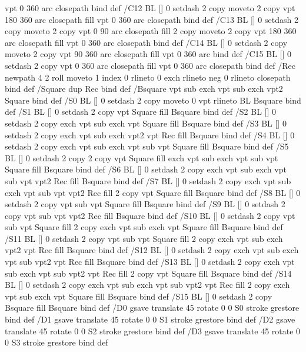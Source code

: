 {{{               vpt 0 360 arc closepath } bind def
/C12 { BL [] 0 setdash 2 copy moveto
       2 copy  vpt 180 360 arc closepath fill
               vpt 0 360 arc closepath } bind def
/C13 { BL [] 0 setdash  2 copy moveto
       2 copy  vpt 0 90 arc closepath fill
       2 copy moveto
       2 copy  vpt 180 360 arc closepath fill
               vpt 0 360 arc closepath } bind def
/C14 { BL [] 0 setdash 2 copy moveto
       2 copy  vpt 90 360 arc closepath fill
               vpt 0 360 arc } bind def
/C15 { BL [] 0 setdash 2 copy vpt 0 360 arc closepath fill
               vpt 0 360 arc closepath } bind def
/Rec   { newpath 4 2 roll moveto 1 index 0 rlineto 0 exch rlineto
       neg 0 rlineto closepath } bind def
/Square { dup Rec } bind def
/Bsquare { vpt sub exch vpt sub exch vpt2 Square } bind def
/S0 { BL [] 0 setdash 2 copy moveto 0 vpt rlineto BL Bsquare } bind def
/S1 { BL [] 0 setdash 2 copy vpt Square fill Bsquare } bind def
/S2 { BL [] 0 setdash 2 copy exch vpt sub exch vpt Square fill Bsquare } bind def
/S3 { BL [] 0 setdash 2 copy exch vpt sub exch vpt2 vpt Rec fill Bsquare } bind def
/S4 { BL [] 0 setdash 2 copy exch vpt sub exch vpt sub vpt Square fill Bsquare } bind def
/S5 { BL [] 0 setdash 2 copy 2 copy vpt Square fill
       exch vpt sub exch vpt sub vpt Square fill Bsquare } bind def
/S6 { BL [] 0 setdash 2 copy exch vpt sub exch vpt sub vpt vpt2 Rec fill Bsquare } bind def
/S7 { BL [] 0 setdash 2 copy exch vpt sub exch vpt sub vpt vpt2 Rec fill
       2 copy vpt Square fill
       Bsquare } bind def
/S8 { BL [] 0 setdash 2 copy vpt sub vpt Square fill Bsquare } bind def
/S9 { BL [] 0 setdash 2 copy vpt sub vpt vpt2 Rec fill Bsquare } bind def
/S10 { BL [] 0 setdash 2 copy vpt sub vpt Square fill 2 copy exch vpt sub exch vpt Square fill
       Bsquare } bind def
/S11 { BL [] 0 setdash 2 copy vpt sub vpt Square fill 2 copy exch vpt sub exch vpt2 vpt Rec fill
       Bsquare } bind def
/S12 { BL [] 0 setdash 2 copy exch vpt sub exch vpt sub vpt2 vpt Rec fill Bsquare } bind def
/S13 { BL [] 0 setdash 2 copy exch vpt sub exch vpt sub vpt2 vpt Rec fill
       2 copy vpt Square fill Bsquare } bind def
/S14 { BL [] 0 setdash 2 copy exch vpt sub exch vpt sub vpt2 vpt Rec fill
       2 copy exch vpt sub exch vpt Square fill Bsquare } bind def
/S15 { BL [] 0 setdash 2 copy Bsquare fill Bsquare } bind def
/D0 { gsave translate 45 rotate 0 0 S0 stroke grestore } bind def
/D1 { gsave translate 45 rotate 0 0 S1 stroke grestore } bind def
/D2 { gsave translate 45 rotate 0 0 S2 stroke grestore } bind def
/D3 { gsave translate 45 rotate 0 0 S3 stroke grestore } bind def
}}

